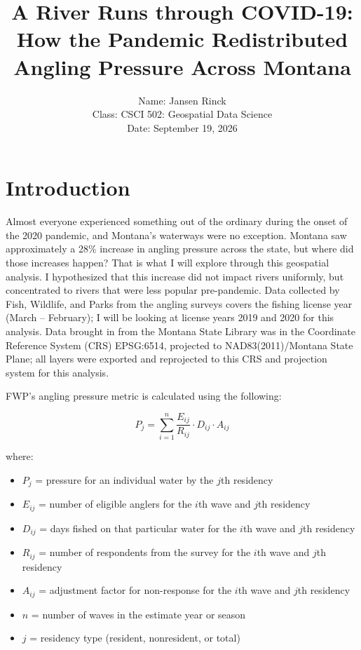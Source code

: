 \documentclass[11pt]{article}
\title{A River Runs through COVID-19: \\ How the Pandemic Redistributed Angling Pressure Across Montana}
\date{}
\author{Name: Jansen Rinck \\ Class: CSCI 502: Geospatial Data Science \\ Date: September 19, 2026}
\providecommand{\tightlist}{%
      \setlength{\itemsep}{0pt}\setlength{\parskip}{0pt}}
\begin{document}
    
    \maketitle
    
    

    
    \hypertarget{introduction}{%
\section{Introduction}\label{introduction}}

Almost everyone experienced something out of the ordinary during the
onset of the 2020 pandemic, and Montana's waterways were no exception.
Montana saw approximately a 28\% increase in angling pressure across the
state, but where did those increases happen? That is what I will explore
through this geospatial analysis. I hypothesized that this increase did
not impact rivers uniformly, but concentrated to rivers that were less
popular pre-pandemic. Data collected by Fish, Wildlife, and Parks from
the angling surveys covers the fishing license year (March -- February);
I will be looking at license years 2019 and 2020 for this analysis. Data
brought in from the Montana State Library was in the Coordinate
Reference System (CRS) EPSG:6514, projected to NAD83(2011)/Montana State
Plane; all layers were exported and reprojected to this CRS and
projection system for this analysis.

FWP's angling pressure metric is calculated using the following:

\[
P_j = \sum_{i=1}^{n} \frac{E_{ij}}{R_{ij}} \cdot D_{ij} \cdot A_{ij}
\]

where:

\begin{itemize}
\tightlist
\item
  \(P_j\) = pressure for an individual water by the \(j\)th residency
\item
  \(E_{ij}\) = number of eligible anglers for the \(i\)th wave and
  \(j\)th residency
\item
  \(D_{ij}\) = days fished on that particular water for the \(i\)th wave
  and \(j\)th residency
\item
  \(R_{ij}\) = number of respondents from the survey for the \(i\)th
  wave and \(j\)th residency
\item
  \(A_{ij}\) = adjustment factor for non-response for the \(i\)th wave
  and \(j\)th residency
\item
  \(n\) = number of waves in the estimate year or season
\item
  \(j\) = residency type (resident, nonresident, or total)
\end{itemize}
\end{document}
